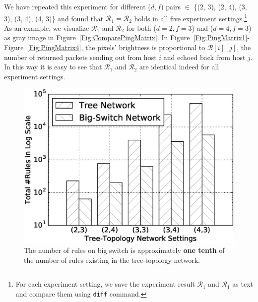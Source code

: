 We have repeated this experiment for different ($d, f$) pairs $\in$
\{(2, 3), (2, 4), (3, 3), (3, 4), (4, 3)\} and found that
$\mathcal{R}_1 = \mathcal{R}_2$ holds in all five experiment settings.\footnote{For each
experiment setting, we save the experiment result $\mathcal{R}_1$ and $\mathcal{R}_1$
as text and compare them using \texttt{diff} command.}
As an example, we visualize $\mathcal{R}_1$ and $\mathcal{R}_2$ for both ($d=2, f=3$)
and ($d=4, f=3$) as gray image in Figure~\ref{Fig:ComparePingMatrix}.
In Figure~\ref{Fig:PingMatrix1}-Figure~\ref{Fig:PingMatrix4},
the pixels' brightness is proportional to $\mathcal{R}[i][j]$,
the number of returned packets sending out from host $i$ and echoed back from host $j$.
In this way it is easy to see that $\mathcal{R}_1$ and $\mathcal{R}_2$ are identical
indeed for all experiment settings.


\begin{figure}[h]
\centering
\includegraphics[scale=.42]{figures/comp_num_rules.eps}
\caption{The number of rules on big switch is approximately \textbf{one tenth} of the
        number of rules existing in the tree-topology network.}
\label{Fig:CompareNumRules}
\end{figure}

